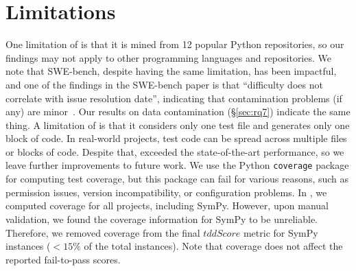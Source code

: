 \section{Limitations}

One limitation of \tdd is that it is mined from 12 popular Python
repositories, so our findings may not apply to other programming
languages and repositories.  We note that SWE-bench, despite having
the same limitation, has been impactful, and one of the findings in
the SWE-bench paper is that ``difficulty does not correlate with issue
resolution date'', indicating that contamination problems (if any) are
minor~\cite{jimenezswe}.  Our results on data contamination
(\S\ref{sec:rq7}) indicate the same thing.
A limitation of \solx is that it considers only one test file and
generates only one block of code.  In real-world projects, test code
can be spread across multiple files or blocks of code.
Despite that, \solx exceeded the state-of-the-art performance, so we
leave further improvements to future work.  We use the Python
\texttt{\small coverage} package for computing test coverage, but this
package can fail for various reasons, such as permission issues,
version incompatibility, or configuration problems. In \solx, we
computed coverage for all projects, including SymPy. However, upon
manual validation, we found the coverage information for SymPy to be
unreliable. Therefore, we removed coverage from the final
$\mathit{tddScore}$ metric for SymPy instances ($<\!\!15\%$ of the
total instances).  Note that coverage does not affect the reported
fail-to-pass scores.
